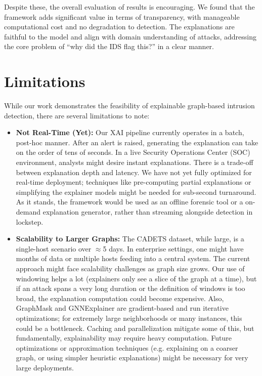 \documentclass[conference]{IEEEtran}
\begin{document}
Despite these, the overall evaluation of results is encouraging. We found that the framework adds significant value in terms of transparency, with manageable computational cost and no degradation to detection. The explanations are faithful to the model and align with domain understanding of attacks, addressing the core problem of ``why did the IDS flag this?'' in a clear manner.

\section{Limitations}
While our work demonstrates the feasibility of explainable graph-based intrusion detection, there are several limitations to note:
\begin{itemize}
    \item \textbf{Not Real-Time (Yet):} Our XAI pipeline currently operates in a batch, post-hoc manner. After an alert is raised, generating the explanation can take on the order of tens of seconds. In a live Security Operations Center (SOC) environment, analysts might desire instant explanations. There is a trade-off between explanation depth and latency. We have not yet fully optimized for real-time deployment; techniques like pre-computing partial explanations or simplifying the explainer models might be needed for sub-second turnaround. As it stands, the framework would be used as an offline forensic tool or a on-demand explanation generator, rather than streaming alongside detection in lockstep.
    \item \textbf{Scalability to Larger Graphs:} The CADETS dataset, while large, is a single-host scenario over $\approx$5 days. In enterprise settings, one might have months of data or multiple hosts feeding into a central system. The current approach might face scalability challenges as graph size grows. Our use of windowing helps a lot (explainers only see a slice of the graph at a time), but if an attack spans a very long duration or the definition of windows is too broad, the explanation computation could become expensive. Also, GraphMask and GNNExplainer are gradient-based and run iterative optimizations; for extremely large neighborhoods or many instances, this could be a bottleneck. Caching and parallelization mitigate some of this, but fundamentally, explainability may require heavy computation. Future optimizations or approximation techniques (e.g. explaining on a coarser graph, or using simpler heuristic explanations) might be necessary for very large deployments.

\end{itemize}
\end{document}
